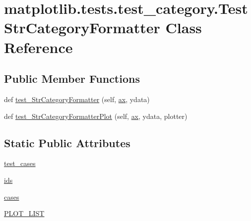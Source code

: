 \hypertarget{classmatplotlib_1_1tests_1_1test__category_1_1TestStrCategoryFormatter}{}\section{matplotlib.\+tests.\+test\+\_\+category.\+Test\+Str\+Category\+Formatter Class Reference}
\label{classmatplotlib_1_1tests_1_1test__category_1_1TestStrCategoryFormatter}
\subsection*{Public Member Functions}
\begin{DoxyCompactItemize}
\item 
def \hyperlink{classmatplotlib_1_1tests_1_1test__category_1_1TestStrCategoryFormatter_ace0eca2956eb4e7abd3f518cb4ff502c}{test\+\_\+\+Str\+Category\+Formatter} (self, \hyperlink{namespacematplotlib_1_1tests_1_1test__category_ac4a78c2ee1d8720275b6d0ca5dee3c1c}{ax}, ydata)
\item 
def \hyperlink{classmatplotlib_1_1tests_1_1test__category_1_1TestStrCategoryFormatter_a776c0637792b0bd239f55aac55df6f5d}{test\+\_\+\+Str\+Category\+Formatter\+Plot} (self, \hyperlink{namespacematplotlib_1_1tests_1_1test__category_ac4a78c2ee1d8720275b6d0ca5dee3c1c}{ax}, ydata, plotter)
\end{DoxyCompactItemize}
\subsection*{Static Public Attributes}
\begin{DoxyCompactItemize}
\item 
\hyperlink{classmatplotlib_1_1tests_1_1test__category_1_1TestStrCategoryFormatter_a0abbd58e4a3c8bf3ae73a4ebdedaa6b8}{test\+\_\+cases}
\item 
\hyperlink{classmatplotlib_1_1tests_1_1test__category_1_1TestStrCategoryFormatter_a857db7555c4cd9812e49f2a8791df97c}{ids}
\item 
\hyperlink{classmatplotlib_1_1tests_1_1test__category_1_1TestStrCategoryFormatter_a64c266a02d61f3dccd202eb8b98f197b}{cases}
\item 
\hyperlink{classmatplotlib_1_1tests_1_1test__category_1_1TestStrCategoryFormatter_a8685234563052ca9dc4c4fea4f672d57}{P\+L\+O\+T\+\_\+\+L\+I\+ST}
\end{DoxyCompactItemize}


